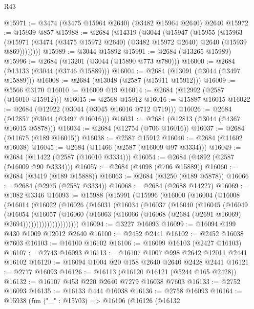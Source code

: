 \begin{lexlean}{R43}
\begin{coremodule}
@15971 := @3474 (@3475 @15964 @2640) (@3482 @15964 @2640) @2640
@15972 := @15939 @857
@15988 := @2684
    (@14319
      (@3044
        (@15947
          (@15955
            (@15963
              (@15971 (@3474 (@3475 @15972 @2640) (@3482 @15972 @2640) @2640 (@15939 @869))))))))
@15989 := @3044 @15892
@15991 := @2684 (@13265 @15989)
@15996 := @2684 (@13201 (@3044 (@15890 @773 @780)))
@16000 := @2684 (@13133 (@3044 (@3746 @15889)))
@16004 := @2684 (@13091 (@3044 (@3497 @15889)))
@16008 := @2684 (@13048 (@2587 (@15911 @15912)))
@16009 := @5566 @3170
@16010 := @16009 @19
@16014 := @2684 (@12992 (@2587 (@16010 @15912)))
@16015 := @2568 @15912
@16016 := @15887 @16015
@16022 := @2684 (@12922 (@3044 (@3045 @16016 @712 @719)))
@16026 := @2684 (@12857 (@3044 (@3497 @16016)))
@16031 := @2684 (@12813 (@3044 (@4367 @16015 @5878)))
@16034 := @2684 (@12754 (@706 @16016))
@16037 := @2684 (@11675 (@189 @16015))
@16038 := @2587 @15912
@16040 := @2684 (@11602 @16038)
@16045 := @2684 (@11466 (@2587 (@16009 @97 @3334)))
@16049 := @2684 (@11422 (@2587 (@16010 @3334)))
@16054 := @2684 (@4892 (@2587 (@16009 @90 @3334)))
@16057 := @2684 (@4098 (@706 @15889))
@16060 := @2684 (@3419 (@189 @15888))
@16063 := @2684 (@3250 (@189 @5878))
@16066 := @2684 (@2975 (@2587 @3334))
@16068 := @2684 (@2688 @14227)
@16069 := @1082 @3346
@16093 := @15988
    (@15991
      (@15996
        (@16000
          (@16004
            (@16008
              (@16014
                (@16022
                  (@16026
                    (@16031
                      (@16034
                        (@16037
                          (@16040
                            (@16045
                              (@16049
                                (@16054
                                  (@16057
                                    (@16060
                                      (@16063
                                        (@16066
                                          (@16068 (@2684 (@2691 @16069) @2694)))))))))))))))))))))
@16094 := @3227 @16093
@16099 := @16094 @199 @430 @1009 @12012 @2640
@16100 := @2452 @2441
@16102 := @2452 @16038 @7603
@16103 := @16100 @16102
@16106 := @16099 @16103 (@2427 @16103)
@16107 := @2743 @16093
@16113 := @16107 @1007 @998 @2642 @12011 @2441 @16102
@16120 := @16094 @1004 @20 @158 @2640 @2640 @2428 @2441
@16121 := @2777 @16093
@16126 := @16113 (@16120 @16121 (@5244 @165 @2428))
@16132 := @16107 @453 @220 @2640 @7279 @16038 @7603
@16133 := @2752 @16093
@16135 := @16133 @444 @16038
@16136 := @2758 @16093
@16164 := @15938
    (fun ("_" : @15703) =>
    @16106
      (@16126
        (@16132

\end{coremodule}
\end{lexlean}
